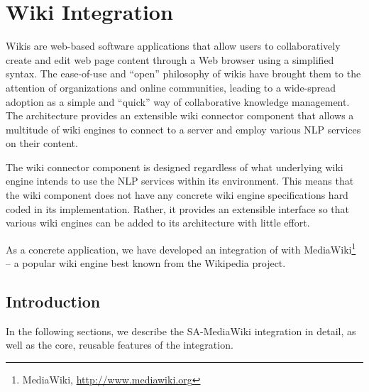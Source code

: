 %
%
%   
% 

\chapter{Wiki Integration}
\label{chap:wiki}
Wikis are web-based software applications that allow users to collaboratively create and edit web page content through a Web browser using a simplified syntax. The ease-of-use and ``open'' philosophy of wikis have brought them to the attention of organizations and online communities, leading to a wide-spread adoption as a simple and ``quick'' way of collaborative knowledge management. The \sa architecture provides an extensible wiki connector component that allows a multitude of wiki engines to connect to a \sa server and employ various NLP services on their content.

The wiki connector component is designed regardless of what underlying wiki engine intends to use the NLP services within its environment. This means that the wiki component does not have any concrete wiki engine specifications hard coded in its implementation. Rather, it provides an extensible interface so that various wiki engines can be added to its architecture with little effort.

As a concrete application, we have developed an integration of \sa with MediaWiki\footnote{MediaWiki, \url{http://www.mediawiki.org}} -- a popular wiki engine best known from the Wikipedia project. 

\section{Introduction}
In the following sections, we describe the SA-MediaWiki integration in detail, as well as the core, reusable features of the \wikinlp integration.

